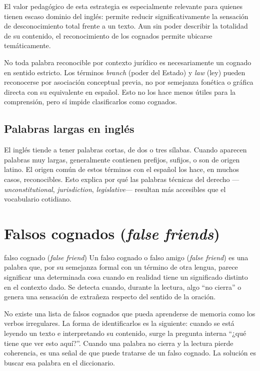 \documentclass[12pt,oneside]{book}
\begin{document}
El valor pedagógico de esta estrategia es especialmente relevante para quienes tienen escaso dominio del inglés: permite reducir significativamente la sensación de desconocimiento total frente a un texto. Aun sin poder describir la totalidad de su contenido, el reconocimiento de los cognados permite ubicarse temáticamente.

\begin{note}
No toda palabra reconocible por contexto jurídico es necesariamente un cognado en sentido estricto. Los términos \textit{branch} (poder del Estado) y \textit{law} (ley) pueden reconocerse por asociación conceptual previa, no por semejanza fonética o gráfica directa con su equivalente en español. Esto no los hace menos útiles para la comprensión, pero sí impide clasificarlos como cognados.
\end{note}

\subsection{Palabras largas en inglés}

El inglés tiende a tener palabras cortas, de dos o tres sílabas. Cuando aparecen palabras muy largas, generalmente contienen prefijos, sufijos, o son de origen latino. El origen común de estos términos con el español los hace, en muchos casos, reconocibles. Esto explica por qué las palabras técnicas del derecho ---\textit{unconstitutional}, \textit{jurisdiction}, \textit{legislative}--- resultan más accesibles que el vocabulario cotidiano.

\section{Falsos cognados (\textit{false friends})}
\label{sec:falsos-cognados}

\begin{definition}{falso cognado (\textit{false friend})}
Un falso cognado o falso amigo (\textit{false friend}) es una palabra que, por su semejanza formal con un término de otra lengua, parece significar una determinada cosa cuando en realidad tiene un significado distinto en el contexto dado. Se detecta cuando, durante la lectura, algo ``no cierra'' o genera una sensación de extrañeza respecto del sentido de la oración.
\end{definition}

No existe una lista de falsos cognados que pueda aprenderse de memoria como los verbos irregulares. La forma de identificarlos es la siguiente: cuando se está leyendo un texto e interpretando su contenido, surge la pregunta interna ``¿qué tiene que ver esto aquí?''. Cuando una palabra no cierra y la lectura pierde coherencia, es una señal de que puede tratarse de un falso cognado. La solución es buscar esa palabra en el diccionario.
\end{document}
